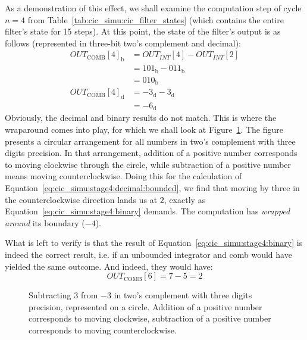 As a  demonstration of this effect,  we shall examine the  computation step of
cycle $n = 4$  from Table~\ref{tab:cic_simu:cic_filter_states} (which contains
the  entire filter's  state for  15 steps). At  this point,  the state  of the
filter's output is  as follows (represented in three-bit  two's complement and
decimal):
\begin{align}
    OUT_\mathrm{COMB}[4]_\mathrm{b} &= OUT_{INT}[4] - OUT_{INT}[2]     \nonumber\\
                             &= 101_\mathrm{b} - 011_\mathrm{b} \nonumber\\
                             &= 010_\mathrm{b}
    \label{eq:cic_simu:stage4:binary} \\
    OUT_\mathrm{COMB}[4]_\mathrm{d} &= -3_\mathrm{d} - 3_\mathrm{d}    \nonumber\\
                             &= -6_\mathrm{d}
    \label{eq:cic_simu:stage4:decimal:bounded}
\end{align}
Obviously,   the  decimal   and   binary  results   do   not  match. This   is
where   the  wraparound   comes   into   play,  for   which   we  shall   look
at  Figure~\ref{fig:cic_simu:twos_complement_circle}. The  figure  presents  a
circular  arrangement  for   all  numbers  in  two's   complement  with  three
digits  precision.   In  that  arrangement,  addition  of  a  positive  number
corresponds to  moving clockwise  through the circle,  while subtraction  of a
positive number means moving  counterclockwise. Doing this for the calculation
of  Equation~\ref{eq:cic_simu:stage4:decimal:bounded},  we  find  that  moving
by  three  in  the  counterclockwise   direction  lands  us  at  $2$,  exactly
as   Equation~\ref{eq:cic_simu:stage4:binary}  demands. The   computation  has
\emph{wrapped around} its boundary ($-4$).

What     is     left    to     verify     is     that    the     result     of
Equation~\ref{eq:cic_simu:stage4:binary} is indeed the correct result, i.e. if
an  unbounded integrator  and comb  would have  yielded the  same outcome. And
indeed, they would have:
\begin{equation}
    \label{eq:cic_simu:stage4:decimal:unbounded}
    OUT_\mathrm{COMB}[6] = 7 - 5 = 2
\end{equation}

\begin{figure}
    \centering
    
    \caption[Two's Complement Circle]{%
        Subtracting  $3$  from $-3$  in  two's  complement with  three  digits
        precision,  represented on  a  circle. Addition of  a positive  number
        corresponds  to moving  clockwise,  subtraction of  a positive  number
        corresponds to moving counterclockwise.%
    }
    \label{fig:cic_simu:twos_complement_circle}
\end{figure}

